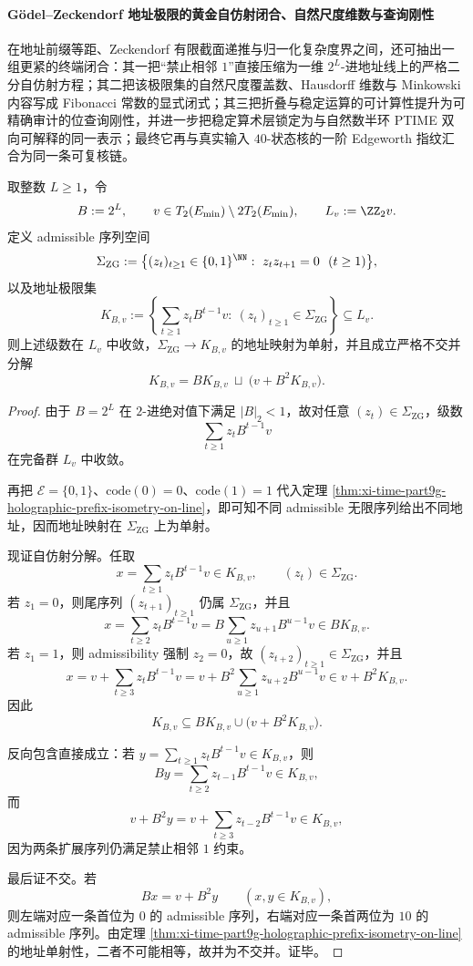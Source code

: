 \paragraph{Gödel--Zeckendorf 地址极限的黄金自仿射闭合、自然尺度维数与查询刚性}
在地址前缀等距、Zeckendorf 有限截面递推与归一化复杂度界之间，还可抽出一组更紧的终端闭合：其一把“禁止相邻 \(1\)”直接压缩为一维 \(2^L\)-进地址线上的严格二分自仿射方程；其二把该极限集的自然尺度覆盖数、Hausdorff 维数与 Minkowski 内容写成 Fibonacci 常数的显式闭式；其三把折叠与稳定运算的可计算性提升为可精确审计的位查询刚性，并进一步把稳定算术层锁定为与自然数半环 PTIME 双向可解释的同一表示；最终它再与真实输入 \(40\)-状态核的一阶 Edgeworth 指纹汇合为同一条可复核链。

\begin{theorem}\label{thm:xi-zg-address-binary-self-affine}
取整数 \(L\ge 1\)，令
\[
B:=2^L,
\qquad
v\in T_2(E_{\min})\setminus 2T_2(E_{\min}),
\qquad
L_v:=\ZZ_2v.
\]
定义 admissible 序列空间
\[
\Sigma_{\mathrm{ZG}}
:=
\bigl\{
(z_t)_{t\ge 1}\in\{0,1\}^{\NN}:\ z_tz_{t+1}=0\ \ (t\ge 1)
\bigr\},
\]
以及地址极限集
\[
K_{B,v}
:=
\left\{
\sum_{t\ge 1}z_tB^{t-1}v:\ (z_t)_{t\ge 1}\in\Sigma_{\mathrm{ZG}}
\right\}
\subseteq L_v.
\]
则上述级数在 \(L_v\) 中收敛，\(\Sigma_{\mathrm{ZG}}\to K_{B,v}\) 的地址映射为单射，并且成立严格不交并分解
\[
\boxed{\;
K_{B,v}
=
BK_{B,v}\ \sqcup\ \bigl(v+B^2K_{B,v}\bigr).\;}
\]
\end{theorem}
\begin{proof}
由于 \(B=2^L\) 在 \(2\)-进绝对值下满足 \(|B|_2<1\)，故对任意 \((z_t)\in\Sigma_{\mathrm{ZG}}\)，级数
\[
\sum_{t\ge 1}z_tB^{t-1}v
\]
在完备群 \(L_v\) 中收敛。

再把 \(\mathcal E=\{0,1\}\)、\(\mathrm{code}(0)=0\)、\(\mathrm{code}(1)=1\) 代入定理
\ref{thm:xi-time-part9g-holographic-prefix-isometry-on-line}，即可知不同 admissible 无限序列给出不同地址，因而地址映射在 \(\Sigma_{\mathrm{ZG}}\) 上为单射。

现证自仿射分解。任取
\[
x=\sum_{t\ge 1}z_tB^{t-1}v\in K_{B,v},
\qquad
(z_t)\in\Sigma_{\mathrm{ZG}}.
\]
若 \(z_1=0\)，则尾序列 \((z_{t+1})_{t\ge 1}\) 仍属 \(\Sigma_{\mathrm{ZG}}\)，并且
\[
x
=
\sum_{t\ge 2}z_tB^{t-1}v
=
B\sum_{u\ge 1}z_{u+1}B^{u-1}v
\in BK_{B,v}.
\]
若 \(z_1=1\)，则 admissibility 强制 \(z_2=0\)，故 \((z_{t+2})_{t\ge 1}\in\Sigma_{\mathrm{ZG}}\)，并且
\[
x
=
v+\sum_{t\ge 3}z_tB^{t-1}v
=
v+B^2\sum_{u\ge 1}z_{u+2}B^{u-1}v
\in v+B^2K_{B,v}.
\]
因此
\[
K_{B,v}\subseteq BK_{B,v}\cup\bigl(v+B^2K_{B,v}\bigr).
\]

反向包含直接成立：若 \(y=\sum_{t\ge 1}z_tB^{t-1}v\in K_{B,v}\)，则
\[
By=\sum_{t\ge 2}z_{t-1}B^{t-1}v\in K_{B,v},
\]
而
\[
v+B^2y
=
v+\sum_{t\ge 3}z_{t-2}B^{t-1}v
\in K_{B,v},
\]
因为两条扩展序列仍满足禁止相邻 \(1\) 约束。

最后证不交。若
\[
Bx=v+B^2y
\qquad
(x,y\in K_{B,v}),
\]
则左端对应一条首位为 \(0\) 的 admissible 序列，右端对应一条首两位为 \(10\) 的 admissible 序列。由定理
\ref{thm:xi-time-part9g-holographic-prefix-isometry-on-line} 的地址单射性，二者不可能相等，故并为不交并。证毕。
\end{proof}

